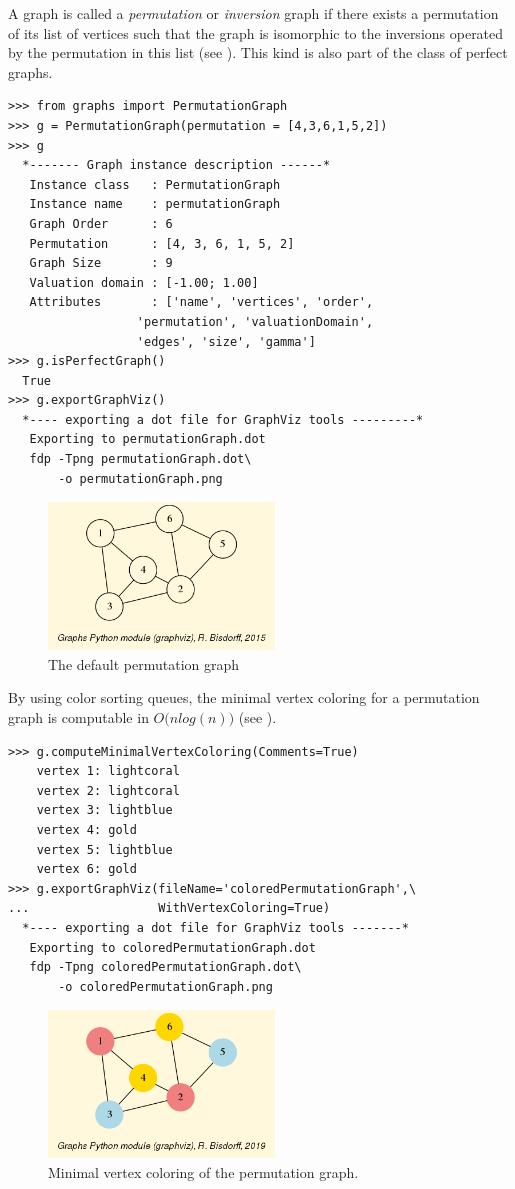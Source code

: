 A graph is called a \emph{permutation} or \emph{inversion} graph if there exists a permutation of its list of vertices such that the graph is isomorphic to the inversions operated by the permutation in this list (see \citet[Chapter 7, pp 157-170]{GOL-2004}). This kind is also part of the class of perfect graphs.
\begin{lstlisting}
>>> from graphs import PermutationGraph
>>> g = PermutationGraph(permutation = [4,3,6,1,5,2])
>>> g
  *------- Graph instance description ------*
   Instance class   : PermutationGraph
   Instance name    : permutationGraph
   Graph Order      : 6
   Permutation      : [4, 3, 6, 1, 5, 2]
   Graph Size       : 9
   Valuation domain : [-1.00; 1.00]
   Attributes       : ['name', 'vertices', 'order',
                  'permutation', 'valuationDomain',
                  'edges', 'size', 'gamma']
>>> g.isPerfectGraph()
  True
>>> g.exportGraphViz()
  *---- exporting a dot file for GraphViz tools ---------*
   Exporting to permutationGraph.dot
   fdp -Tpng permutationGraph.dot\
       -o permutationGraph.png
\end{lstlisting}
\begin{figure}[h]
\sidecaption
\includegraphics[width=6cm]{Figures/permutationGraph.png}
\caption{The default \Digraph permutation graph} 
\label{fig:25.4}       %
\end{figure}

By using color sorting queues, the minimal vertex coloring for a permutation graph is computable in $O\big(n log(n)\big)$ (see \citet{GOL-2004}).
\begin{lstlisting}
>>> g.computeMinimalVertexColoring(Comments=True)
    vertex 1: lightcoral
    vertex 2: lightcoral
    vertex 3: lightblue
    vertex 4: gold
    vertex 5: lightblue
    vertex 6: gold
>>> g.exportGraphViz(fileName='coloredPermutationGraph',\
...                  WithVertexColoring=True)
  *---- exporting a dot file for GraphViz tools -------*
   Exporting to coloredPermutationGraph.dot
   fdp -Tpng coloredPermutationGraph.dot\
       -o coloredPermutationGraph.png
\end{lstlisting}
\begin{figure}[h]
\sidecaption
\includegraphics[width=6cm]{Figures/coloredPermutationGraph.png}
\caption{Minimal vertex coloring of the permutation graph.} 
\label{fig:25.5}       %
\end{figure}

